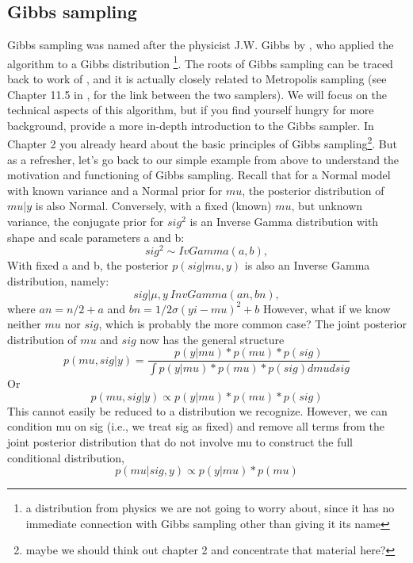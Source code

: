 \subsection{Gibbs sampling}
Gibbs sampling was named after the physicist J.W. Gibbs by \citet{geman_geman:1984}, who applied the algorithm to a Gibbs distribution \footnote{a distribution from physics we are not going to worry about, since it has no immediate connection with Gibbs sampling other than giving it its name}. The roots of Gibbs sampling can be traced back to work of \citet{metropolis_ulam:1953}, and it is actually closely related to Metropolis sampling (see Chapter 11.5 in \citet{gelman_etal:2004}, for the link between the two samplers). We will focus on the technical aspects of this algorithm, but if you find yourself hungry for more background, \citet{casella_george:1992} provide a more in-depth introduction to the Gibbs sampler.   
In Chapter 2 you already heard about the basic principles of Gibbs
sampling\footnote{maybe we should think out chapter 2 and concentrate
  that material here?}. But as a refresher, let's go back to our
simple example from above to understand the motivation and functioning
of Gibbs sampling. Recall that for a Normal model with known variance
and a Normal prior for $mu$, the posterior distribution of $mu|y$ is also
Normal. Conversely, with a fixed (known) $mu$, but unknown variance, the
conjugate prior for $sig^2$ is an Inverse Gamma distribution with shape and scale parameters a and b:
\[ 
sig^2 \sim IvGamma(a,b),
\]
With fixed a and b, the posterior $p(sig|mu,y)$ is also an Inverse Gamma distribution, namely:
\begin{equation}
sig|\mu,y ~ Inv Gamma (an, bn),						
\label{eq. 3}
\end{equation}
 where  $an = n/2   + a$ and $bn = 1/2 \sigma (yi-mu)^2+ b$
However, what if we know neither $mu$ nor $sig$, which is probably the more common case? The joint posterior distribution of $mu$ and $sig$ now has the general structure
\[
p(mu, sig|y) = \frac{p(y|mu)* p(mu) *p(sig)}{ \int p(y|mu)* p(mu) *p(sig) dmu dsig }
\]
Or
\[
p(mu, sig|y) \propto p(y|mu)* p(mu) *p(sig)
\]
This cannot easily be reduced to a distribution we recognize. However, we can condition mu on sig (i.e., we treat sig as fixed) and remove all terms from the joint posterior distribution that do not involve mu to construct the full conditional distribution, 
\[
p(mu|sig,y)  \propto p(y|mu)* p(mu) 
\]


